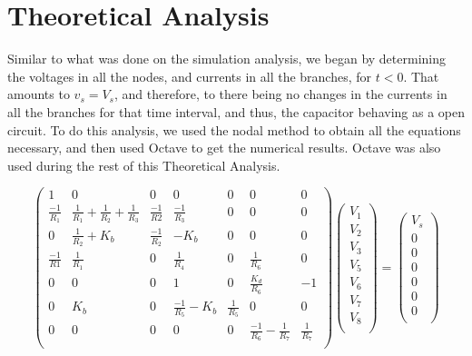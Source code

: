 \section{Theoretical Analysis}
\label{sec:analysis}


Similar to what was done on the simulation analysis, we began by determining the voltages in all the nodes, and currents in all the branches, for $t<0$. That amounts to $v_s=V_s$, and therefore, to there being no changes in the currents in all the branches for that time interval, and thus, the capacitor behaving as a open circuit. To do this analysis, we used the nodal method to obtain all the equations necessary, and then used Octave to get the numerical results. Octave was also used during the rest of this Theoretical Analysis.
 

\begin{equation}
\begin{pmatrix}
1 & 0 & 0 & 0 & 0 & 0 & 0\\
\frac{-1}{R_1} & \frac{1}{R_1} + \frac{1}{R_2} + \frac{1}{R_3} & \frac{-1}{R2} & \frac{-1}{R_3} & 0 & 0 & 0\\
0 & \frac{1}{R_2} + K_b & \frac{-1}{R_2} & -K_b & 0 & 0 & 0\\
\frac{-1}{R1} & \frac{1}{R_1} & 0 & \frac{1}{R_4} & 0 & \frac{1}{R_6} & 0\\
0 & 0 & 0 & 1 & 0 & \frac{K_d}{R_6} & -1\\
0 & K_b & 0 & \frac{-1}{R_5} - K_b & \frac{1}{R_5} & 0 & 0\\
0 & 0 & 0 & 0 & 0 & \frac{-1}{R_6} - \frac{1}{R_7} & \frac{1}{R_7}\\


\end{pmatrix}
\begin{pmatrix}
V_1\\
V_2\\
V_3\\
V_5\\
V_6\\
V_7\\
V_8\\
\end{pmatrix}
=
\begin{pmatrix}
V_s\\
0\\
0\\
0\\
0\\
0\\
0\\
\end{pmatrix}
\label{eq:MatrixKCL}
\end{equation}

